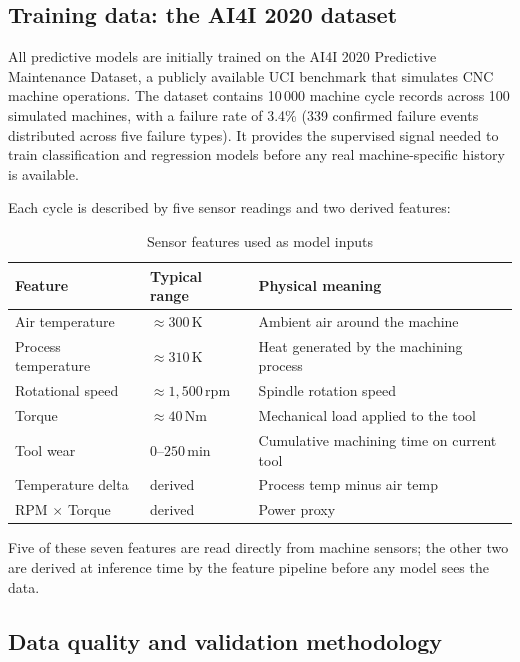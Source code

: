 \subsection{Training data: the AI4I 2020 dataset}

All predictive models are initially trained on the AI4I 2020 Predictive Maintenance Dataset, a publicly available UCI benchmark that simulates CNC machine operations. The dataset contains 10\,000 machine cycle records across 100 simulated machines, with a failure rate of 3.4\% (339 confirmed failure events distributed across five failure types). It provides the supervised signal needed to train classification and regression models before any real machine-specific history is available.

Each cycle is described by five sensor readings and two derived features:

\begin{table}[h]
\centering
\begin{tabularx}{\textwidth}{|X|X|X|}
\toprule
\textbf{Feature} & \textbf{Typical range} & \textbf{Physical meaning} \\
\midrule
Air temperature     & $\approx 300\,\mathrm{K}$   & Ambient air around the machine \\
\midrule
Process temperature & $\approx 310\,\mathrm{K}$   & Heat generated by the machining process \\
\midrule
Rotational speed    & $\approx 1{,}500\,\mathrm{rpm}$ & Spindle rotation speed \\
\midrule
Torque              & $\approx 40\,\mathrm{Nm}$   & Mechanical load applied to the tool \\
\midrule
Tool wear           & $0$--$250\,\mathrm{min}$    & Cumulative machining time on current tool \\
\midrule
Temperature delta   & derived                     & Process temp minus air temp \\
\midrule
RPM $\times$ Torque & derived                     & Power proxy \\
\bottomrule
\end{tabularx}
\caption{Sensor features used as model inputs}
\label{tab:features}
\end{table}

Five of these seven features are read directly from machine sensors; the other two are derived at inference time by the feature pipeline before any model sees the data.

\subsection{Data quality and validation methodology}

